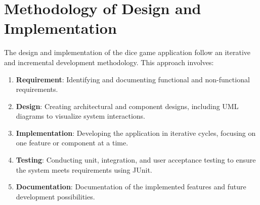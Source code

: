 \section{Methodology of Design and Implementation}

The design and implementation of the dice game application follow an iterative and incremental development methodology. This approach involves:
\begin{enumerate}
    \item \textbf{Requirement}: Identifying and documenting functional and non-functional requirements.
    \item \textbf{Design}: Creating architectural and component designs, including UML diagrams to visualize system interactions.
    \item \textbf{Implementation}: Developing the application in iterative cycles, focusing on one feature or component at a time.
    \item \textbf{Testing}: Conducting unit, integration, and user acceptance testing to ensure the system meets requirements using JUnit.
    \item \textbf{Documentation}: Documentation of the implemented features and future development possibilities.
\end{enumerate}

